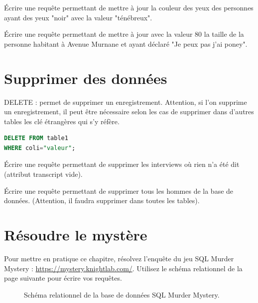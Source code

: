 \begin{Exercise}
\Question Écrire une requête permettant de mettre à jour la couleur des yeux des personnes ayant des yeux "noir" avec la valeur "ténébreux".\\
 \emptybox{2cm}

 
\Question Écrire une requête permettant de mettre à jour avec la valeur 80 la taille de la personne habitant à Avenue Murnane et ayant déclaré "Je peux pas j'ai poney".\\
 \emptybox{2cm}
\end{Exercise}

 
\section{Supprimer des données}
DELETE : permet de supprimer un enregistrement. {}Attention, si l'on supprime un enregistrement, il peut être nécessaire selon les cas de supprimer dans d'autres tables les clé étrangères qui s'y réfère.
\begin{lstlisting}[style=SQLstyle, language=SQL]
DELETE FROM table1
WHERE coli="valeur";
\end{lstlisting}

\begin{Exercise}
\Question Écrire une requête permettant de supprimer les interviews où rien n'a été dit (attribut transcript vide).\\
 \emptybox{2cm}
 
\Question Écrire une requête permettant de supprimer tous les hommes de la base de données. ({}Attention, il faudra supprimer dans toutes les tables).\\
\emptybox{4cm}
\end{Exercise}
 


\newpage
\section{Résoudre le mystère}
Pour mettre en pratique ce chapitre, résolvez l'enquête du jeu SQL Murder Mystery : \url{https://mystery.knightlab.com/}. Utilisez le schéma relationnel de la page suivante pour écrire vos requêtes.

\begin{landscape}
\begin{figure}
    \centering
    \resizebox{\linewidth}{!}{}
    \captionsetup{labelformat=empty}
    \caption{Schéma relationnel de la base de données SQL Murder Mystery.}
    \label{fig:SQLmystery-table}
\end{figure}
\end{landscape}